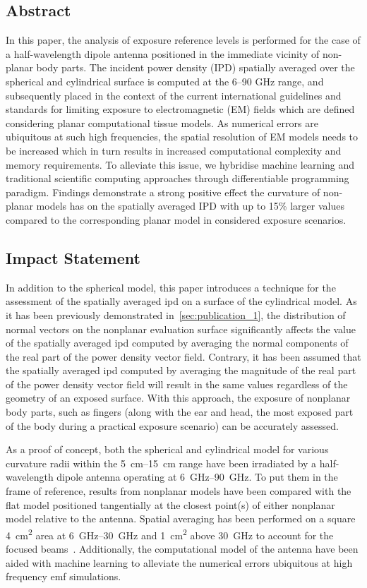 \subsection{Abstract}
In this paper, the analysis of exposure reference levels is performed for the case of a half-wavelength dipole antenna positioned in the immediate vicinity of non-planar body parts.
The incident power density (IPD) spatially averaged over the spherical and cylindrical surface is computed at the 6–90 GHz range, and subsequently placed in the context of the current international guidelines and standards for limiting exposure to electromagnetic (EM) ﬁelds which are deﬁned considering planar computational tissue models.
As numerical errors are ubiquitous at such high frequencies, the spatial resolution of EM models needs to be increased which in turn results in increased computational complexity and memory requirements.
To alleviate this issue, we hybridise machine learning and traditional scientiﬁc computing approaches through differentiable programming paradigm.
Findings demonstrate a strong positive effect the curvature of non-planar models has on the spatially averaged IPD with up to 15\% larger values compared to the corresponding planar model in considered exposure scenarios.

\subsection{Impact Statement}
In addition to the spherical model, this paper introduces a technique for the assessment of the spatially averaged \gls{ipd} on a surface of the cylindrical model.
As it has been previously demonstrated in~\cref{sec:publication_1}, the distribution of normal vectors on the nonplanar evaluation surface significantly affects the value of the spatially averaged \gls{ipd} computed by averaging the normal components of the real part of the power density vector field.
Contrary, it has been assumed that the spatially averaged \gls{ipd} computed by averaging the magnitude of the real part of the power density vector field will result in the same values regardless of the geometry of an exposed surface.
With this approach, the exposure of nonplanar body parts, such as fingers (along with the ear and head, the most exposed part of the body during a practical exposure scenario) can be accurately assessed.

As a proof of concept, both the spherical and cylindrical model for various curvature radii within the \SIrange{5}{15}{\cm} range have been irradiated by a half-wavelength dipole antenna operating at \SIrange{6}{90}{\GHz}.
To put them in the frame of reference, results from nonplanar models have been compared with the flat model positioned tangentially at the closest point(s) of either nonplanar model relative to the antenna.
Spatial averaging has been performed on a square \SI{4}{\cm\squared} area at \SIrange{6}{30}{\GHz} and \SI{1}{\cm\squared} above \SI{30}{\GHz} to account for the focused beams~\cite{Hashimoto2017averaging,Foster2016Thermal}.
Additionally, the computational model of the antenna have been aided with machine learning to alleviate the numerical errors ubiquitous at high frequency \gls{emf} simulations.

